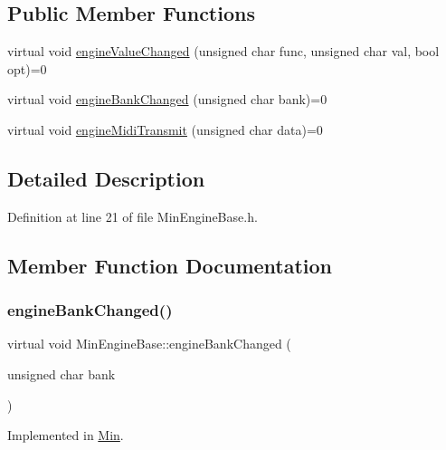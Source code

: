\subsection*{Public Member Functions}
\begin{DoxyCompactItemize}
\item 
virtual void \hyperlink{class_min_engine_base_a35b19eb25b2bbfbcf0bc2262a63ec488}{engine\+Value\+Changed} (unsigned char func, unsigned char val, bool opt)=0
\item 
virtual void \hyperlink{class_min_engine_base_a7c1b890b5c7f0004969304880aaaf563}{engine\+Bank\+Changed} (unsigned char bank)=0
\item 
virtual void \hyperlink{class_min_engine_base_aaed6930bcc32b2cccf9479fb73d043d9}{engine\+Midi\+Transmit} (unsigned char data)=0
\end{DoxyCompactItemize}


\subsection{Detailed Description}


Definition at line 21 of file Min\+Engine\+Base.\+h.



\subsection{Member Function Documentation}
\mbox{\label{class_min_engine_base_a7c1b890b5c7f0004969304880aaaf563}} 
\subsubsection{\texorpdfstring{engine\+Bank\+Changed()}{engineBankChanged()}}
{\footnotesize\ttfamily virtual void Min\+Engine\+Base\+::engine\+Bank\+Changed (\begin{DoxyParamCaption}\item[{unsigned char}]{bank }\end{DoxyParamCaption})\hspace{0.3cm}{\ttfamily [pure virtual]}}



Implemented in \hyperlink{class_min_a24ca9b52ba9755b458f6141d730bb9b1}{Min}.

